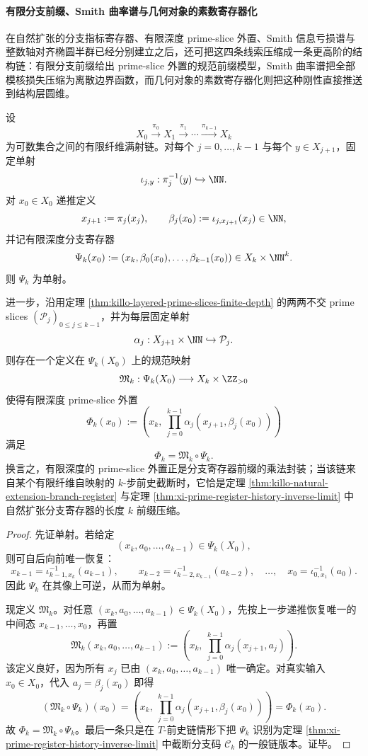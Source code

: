 \paragraph{有限分支前缀、Smith 曲率谱与几何对象的素数寄存器化}
在自然扩张的分支指标寄存器、有限深度 prime-slice 外置、Smith 信息亏损谱与整数轴对齐椭圆半群已经分别建立之后，还可把这四条线索压缩成一条更高阶的结构链：有限分支前缀给出 prime-slice 外置的规范前缀模型，Smith 曲率谱把全部模核损失压缩为离散边界函数，而几何对象的素数寄存器化则把这种刚性直接推送到结构层圆维。

\begin{theorem}[有限深度素数片外置是分支寄存器前缀的乘法封装]\label{thm:xi-finite-depth-primeslice-branch-prefix-compression}
设
\[
X_0\xrightarrow{\pi_0}X_1\xrightarrow{\pi_1}\cdots\xrightarrow{\pi_{k-1}}X_k
\]
为可数集合之间的有限纤维满射链。对每个 \(j=0,\dots,k-1\) 与每个 \(y\in X_{j+1}\)，固定单射
\[
\iota_{j,y}:\pi_j^{-1}(y)\hookrightarrow \NN.
\]
对 \(x_0\in X_0\) 递推定义
\[
x_{j+1}:=\pi_j(x_j),
\qquad
\beta_j(x_0):=\iota_{j,x_{j+1}}(x_j)\in\NN,
\]
并记有限深度分支寄存器
\[
\Psi_k(x_0):=(x_k,\beta_0(x_0),\dots,\beta_{k-1}(x_0))
\in X_k\times \NN^k.
\]
则 \(\Psi_k\) 为单射。

进一步，沿用定理 \ref{thm:killo-layered-prime-slices-finite-depth} 的两两不交 prime slices \((\mathcal P_j)_{0\le j\le k-1}\)，并为每层固定单射
\[
\alpha_j:X_{j+1}\times\NN\hookrightarrow \mathcal P_j.
\]
则存在一个定义在 \(\Psi_k(X_0)\) 上的规范映射
\[
\mathfrak M_k:\Psi_k(X_0)\longrightarrow X_k\times \ZZ_{>0}
\]
使得有限深度 prime-slice 外置
\[
\Phi_k(x_0):=
\left(
x_k,\ \prod_{j=0}^{k-1}\alpha_j(x_{j+1},\beta_j(x_0))
\right)
\]
满足
\[
\boxed{\;
\Phi_k=\mathfrak M_k\circ \Psi_k.\;}
\]
换言之，有限深度的 prime-slice 外置正是分支寄存器前缀的乘法封装；当该链来自某个有限纤维自映射的 \(k\)-步前史截断时，它恰是定理 \ref{thm:killo-natural-extension-branch-register} 与定理 \ref{thm:xi-prime-register-history-inverse-limit} 中自然扩张分支寄存器的长度 \(k\) 前缀压缩。
\end{theorem}
\begin{proof}
先证单射。若给定
\[
(x_k,a_0,\dots,a_{k-1})\in \Psi_k(X_0),
\]
则可自后向前唯一恢复：
\[
x_{k-1}=\iota_{k-1,x_k}^{-1}(a_{k-1}),
\qquad
x_{k-2}=\iota_{k-2,x_{k-1}}^{-1}(a_{k-2}),
\quad \dots,\quad
x_0=\iota_{0,x_1}^{-1}(a_0).
\]
因此 \(\Psi_k\) 在其像上可逆，从而为单射。

现定义 \(\mathfrak M_k\)。对任意 \((x_k,a_0,\dots,a_{k-1})\in \Psi_k(X_0)\)，先按上一步递推恢复唯一的中间态 \(x_{k-1},\dots,x_0\)，再置
\[
\mathfrak M_k(x_k,a_0,\dots,a_{k-1})
:=
\left(
x_k,\ \prod_{j=0}^{k-1}\alpha_j(x_{j+1},a_j)
\right).
\]
该定义良好，因为所有 \(x_j\) 已由 \((x_k,a_0,\dots,a_{k-1})\) 唯一确定。对真实输入 \(x_0\in X_0\)，代入 \(a_j=\beta_j(x_0)\) 即得
\[
(\mathfrak M_k\circ \Psi_k)(x_0)
=
\left(
x_k,\ \prod_{j=0}^{k-1}\alpha_j(x_{j+1},\beta_j(x_0))
\right)
=
\Phi_k(x_0).
\]
故 \(\Phi_k=\mathfrak M_k\circ \Psi_k\)。最后一条只是在 \(T\)-前史链情形下把 \(\Psi_k\) 识别为定理 \ref{thm:xi-prime-register-history-inverse-limit} 中截断分支码 \(\mathcal C_k\) 的一般链版本。证毕。
\end{proof}

